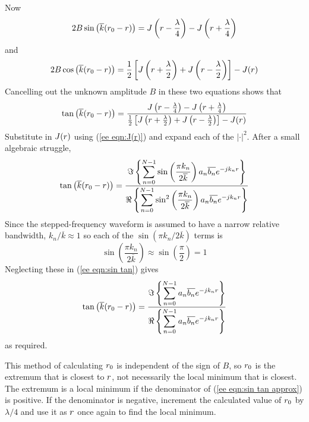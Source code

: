 Now
\begin{equation}
2B\sin\left(\overline{k}({r}_0-{r})\right)=J\left({r}-\frac{\lambda}{4}\right)
-J\left({r}+\frac{\lambda}{4}\right)
\end{equation}
and 
\begin{equation}
2B\cos\left(\overline{k}({r}_0-{r})\right)=
\frac{1}{2}\left[J\left({r}+\frac{\lambda}{2}\right)
+J\left({r}-\frac{\lambda}{2}\right)\right]
-J({r})
\end{equation}
Cancelling out the unknown amplitude $B$ in these two equations shows that
\begin{equation}
\tan\left(\overline{k}({r}_0-{r})\right)=
\frac{
  J\left({r}-\frac{\lambda}{4}\right)-J\left({r}+\frac{\lambda}{4}\right)
}{
  \frac{1}{2}\left[J\left({r}+\frac{\lambda}{2}\right)
  +J\left({r}-\frac{\lambda}{2}\right)\right]-J({r})
}
\end{equation}
Substitute in $J({r})$ using (\ref{ee eqn:J(r)}) and expand each of the
$\left|\cdot\right|^2$.  After a small algebraic struggle,
\begin{equation}\label{ee eqn:sin tan}
\tan\left(\overline{k}({r}_0-{r})\right)=
\frac{
  \Im\left\{
    \displaystyle\sum_{n=0}^{N-1}\sin\left(\frac{\pi k_n}{2\overline{k}}\right)
    a_n\overline{b_n}{e^{-jk_n{r}}}
  \right\}
}{
  \Re\left\{
    \displaystyle\sum_{n=0}^{N-1}\sin^2\left(\frac{\pi k_n}{2\overline{k}}\right)
    a_n\overline{b_n}{e^{-jk_n{r}}}
  \right\}
}
\end{equation}
Since the stepped-frequency waveform is assumed to have a narrow relative
bandwidth, $k_n/\overline{k}\approx 1$ so each of the 
$\sin\left(\pi k_n/2\overline{k}\right)$ terms is
\begin{equation}\label{ee eqn:neglect sin}
\sin\left(\frac{\pi k_n}{2\overline{k}}\right)\approx
\sin\left(\frac{\pi}{2}\right)=1
\end{equation}
Neglecting these in (\ref{ee eqn:sin tan}) gives
\begin{equation}\label{ee eqn:sin tan approx}
\tan\left(\overline{k}({r}_0-{r})\right)=
\frac{\Im\left\{\displaystyle\sum_{n=0}^{N-1}a_n\overline{b_n}{e^{-jk_n{r}}}\right\}}
{\Re\left\{\displaystyle\sum_{n=0}^{N-1}a_n\overline{b_n}{e^{-jk_n{r}}}\right\}}
\end{equation}
as required.

This method of calculating ${r}_0$ is independent of the sign of $B$, so
${r}_0$ is the extremum that is closest to ${r}$, not necessarily 
the local minimum that is closest.  The extremum is a local
minimum if the denominator of (\ref{ee eqn:sin tan approx}) is positive.  
If the denominator is negative, increment the calculated value of ${r}_0$ by
$\lambda/4$ and use it as ${r}$ once again to find the local minimum.

